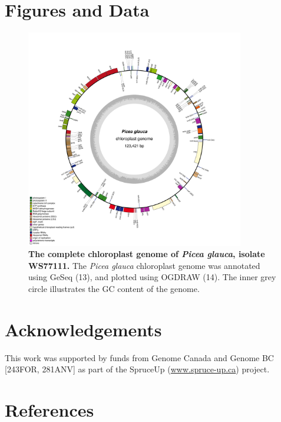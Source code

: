 \documentclass[titlepage,11pt, oneside]{article}   	%
\begin{document}
\section*{Figures and Data}
\begin{figure}[h]
\centering
\includegraphics[width=0.85\textwidth]{WS77111}
\caption{\textbf{The complete chloroplast genome of \textit{Picea glauca}, isolate WS77111.} The \textit{Picea glauca} chloroplast genome was annotated using GeSeq (13), and plotted using OGDRAW (14). The inner grey circle illustrates the GC content of the genome.}
\label{fig:ogdraw}
\end{figure}

\section*{Acknowledgements}
This work was supported by funds from Genome Canada and Genome BC [243FOR, 281ANV] as part of the SpruceUp (\url{www.spruce-up.ca}) project.

\section*{References}
\end{document}
